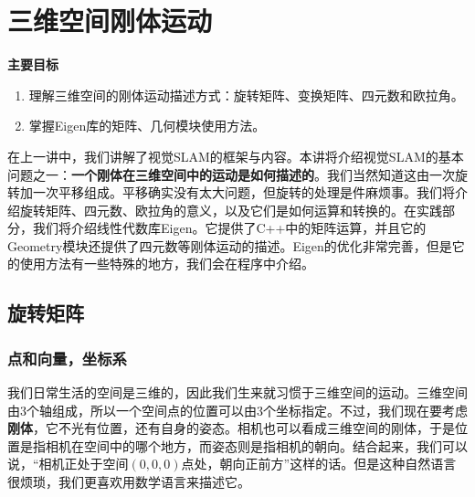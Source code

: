 \chapter{三维空间刚体运动}

\begin{mdframed}  
	\textbf{主要目标}
	\begin{enumerate}[labelindent=0em,leftmargin=1.5em]
		\item 理解三维空间的刚体运动描述方式：旋转矩阵、变换矩阵、四元数和欧拉角。
		\item 掌握Eigen库的矩阵、几何模块使用方法。
	\end{enumerate}
\end{mdframed} 

在上一讲中，我们讲解了视觉SLAM的框架与内容。本讲将介绍视觉SLAM的基本问题之一：\textbf{一个刚体在三维空间中的运动是如何描述的}。我们当然知道这由一次旋转加一次平移组成。平移确实没有太大问题，但旋转的处理是件麻烦事。我们将介绍旋转矩阵、四元数、欧拉角的意义，以及它们是如何运算和转换的。在实践部分，我们将介绍线性代数库Eigen。它提供了C++中的矩阵运算，并且它的Geometry模块还提供了四元数等刚体运动的描述。Eigen的优化非常完善，但是它的使用方法有一些特殊的地方，我们会在程序中介绍。

\newpage


\newpage

\section{旋转矩阵}
\label{sec:rigidMotion}
\subsection{点和向量，坐标系}
我们日常生活的空间是三维的，因此我们生来就习惯于三维空间的运动。三维空间由3个轴组成，所以一个空间点的位置可以由3个坐标指定。不过，我们现在要考虑\textbf{刚体}，它不光有位置，还有自身的姿态。相机也可以看成三维空间的刚体，于是位置是指相机在空间中的哪个地方，而姿态则是指相机的朝向。结合起来，我们可以说，“相机正处于空间$(0,0,0)$点处，朝向正前方”这样的话。但是这种自然语言很烦琐，我们更喜欢用数学语言来描述它。

